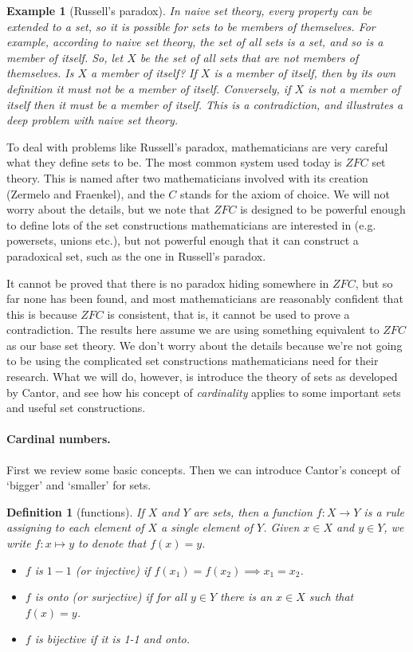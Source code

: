 \documentclass{article}
\theoremstyle{plain}
\newtheorem{definition}[theorem]{Definition}{\bfseries}{\upshape}
\newtheorem{example}[theorem]{Example}{\bfseries}{\upshape}
\begin{document}
\begin{example} [Russell's paradox]
In naive set theory, every property can be extended to a set, so it is possible for sets to be members of themselves. For example, according to naive set theory, the set of all sets is a set, and so is a member of itself. So, let $X$ be the set of all sets that \emph{are not} members of themselves. Is $X$ a member of itself? If $X$ is a member of itself, then by its own definition it must \emph{not} be a member of itself. Conversely, if $X$ is not a member of itself then it must be a member of itself. This is a contradiction, and illustrates a deep problem with naive set theory.   
\end{example} 

To deal with problems like Russell's paradox, mathematicians are very careful what they define sets to be. The most common system used today is $ZFC$ set theory. This is named after two mathematicians involved with its creation (Zermelo and Fraenkel), and the $C$ stands for the axiom of choice. We will not worry about the details, but we note that $ZFC$ is designed to be powerful enough to define lots of the set constructions mathematicians are interested in (e.g. powersets, unions etc.), but not powerful enough that it can construct a paradoxical set, such as the one in Russell's paradox. 

It cannot be proved that there is no paradox hiding somewhere in $ZFC$, but so far none has been found, and most mathematicians are reasonably confident that this is because $ZFC$ is consistent, that is, it cannot be used to prove a contradiction. The results here assume we are using something equivalent to $ZFC$ as our base set theory. We don't worry about the details because we're not going to be using the complicated set constructions mathematicians need for their research. What we will do, however, is introduce the theory of sets as developed by Cantor, and see how his concept of \emph{cardinality} applies to some important sets and useful set constructions.

\paragraph{Cardinal numbers.} 
First we review some basic concepts. Then we can introduce Cantor's concept of `bigger' and `smaller' for sets.
\begin{definition}[functions]
If $X$ and $Y$ are sets, then a \emph{function} $f:X\to Y$ is a rule assigning to each element of $X$ a single element of $Y$. Given $x\in X$ and $y\in Y$, we write $f:x\mapsto y$ to denote that $f(x)=y$. 
\begin{itemize}
\item $f$ is $1-1$ (or \emph{injective}) if $f(x_1)=f(x_2)\implies x_1=x_2$.
\item $f$ is \emph{onto} (or \emph{surjective}) if for all $y\in Y$ there is an $x\in X$ such that $f(x)=y$.
\item $f$ is \emph{bijective} if it is 1-1 and onto.
\end{itemize}
\end{definition}
\end{document}
